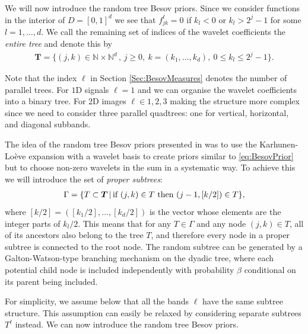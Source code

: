 \documentclass[11pt,a4paper]{article}
\newcommand{\oT}{\boldsymbol{T}}
\newcommand{\N}{\mathbb{N}}
\begin{document}
We will now introduce the random tree Besov priors.
Since we consider functions in the interior of $D=[0,1]^d$ we see that
$f^\ell_{ jk}=0$ if $k_l<0$ or $k_l>2^j-1$ for some $l=1,\dots,d$. 
We call the remaining set of indices of the wavelet coefficients the {\it entire tree} and denote this by
\begin{align*}
\oT=\{(j,k)\in \N\times \N^d\,,\, j\geq 0,\ k=(k_1,\dots,k_d),\
0\leq k_l\leq 2^j-1\}.
\end{align*}

Note that the index $\ell$ in Section \ref{Sec:BesovMeasures} denotes the number of parallel trees. For $1$D signals $\ell=1$ and we can organise the wavelet coefficients into a binary tree. For $2$D images $\ell\in{1,2,3}$ making the structure more complex since we need to consider three parallel quadtrees: one for vertical, horizontal, and diagonal subbands. 

The idea of the random tree Besov priors presented in \cite{Kekkonen2023} was to use the Karhunen-Lo\`eve expansion with a wavelet basis to create priors similar to \eqref{eq:BesovPrior} but to choose non-zero wavelets in the sum in a systematic way. To achieve this we will introduce the set of {\it proper subtrees}:
\begin{align*}
\Gamma=\{T\subset\oT\,|\,
\hbox{if $(j,k)\in T$ then $(j-1,[k/2])\in T$}\},
\end{align*}
where $[k/2]=([k_1/2],\dots,[k_d/2])$ is the vector whose
elements are the integer parts of $k_l/2$. This means that for any $T\in\Gamma$ and any node $(j,k)\in T$, all of its ancestors also belong to the tree $T$, and therefore every node in a proper subtree is connected to the root node. 
The random subtree can be generated by a Galton-Watson-type branching mechanism on the dyadic tree, where each potential child node is included independently with probability $\beta$ conditional on its parent being included.

For simplicity,  we assume below that all the bands $\ell$ have the same subtree structure. This assumption can easily be relaxed by considering separate subtrees $T^\ell$ instead.  
We can now introduce the random tree Besov priors.
\end{document}
